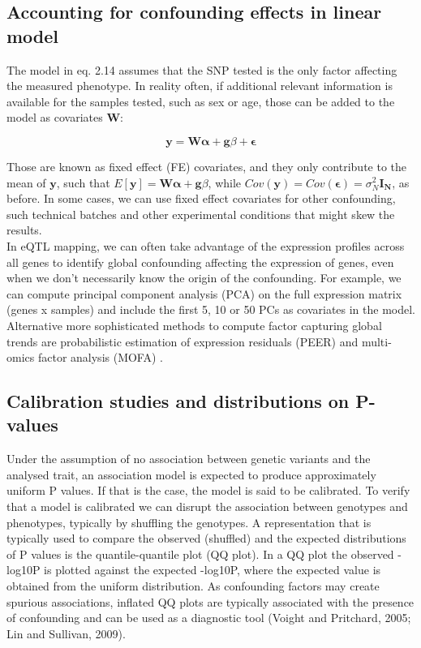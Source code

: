 \subsection{Accounting for confounding effects in linear model}

The model in eq. 2.14 assumes that the SNP tested is the only factor affecting the measured phenotype.
In reality often, if additional relevant information is available for the samples tested, such as sex or age, those can be added to the model as covariates $\mathbf{W}$:

\begin{equation}\label{eq21:Linear_regression_genetics_covariates}
 \mathbf{y} =  \mathbf{W}\boldsymbol{\alpha} + \mathbf{g}\beta + \boldsymbol{\epsilon} 
\end{equation}

Those are known as fixed effect (FE) covariates, and they only contribute to the mean of $\mathbf{y}$, such that $E[\mathbf{y}] = \mathbf{W}\boldsymbol{\alpha} + \mathbf{g}\beta$, while $Cov(\mathbf{y}) = Cov(\boldsymbol{\epsilon}) = \sigma_N^2 \mathbf{I_N} $, as before.
In some cases, we can use fixed effect covariates for other confounding, such technical batches and other experimental conditions that might skew the results. \\

In eQTL mapping, we can often take advantage of the expression profiles across all genes to identify global confounding affecting the expression of genes, even when we don't necessarily know the origin of the confounding.
For example, we can compute principal component analysis (PCA) on the full expression matrix (genes x samples) and include the first 5, 10 or 50 PCs as covariates in the model.
Alternative more sophisticated methods to compute factor capturing global trends are probabilistic estimation of expression residuals (PEER) \cite{stegle2010bayesian, stegle2012using} and multi-omics factor analysis (MOFA) \cite{argelaguet2018multi}. 

\subsection{Calibration studies and distributions on P-values}

Under the assumption of no association between genetic variants and the analysed trait, an association model is expected to produce approximately uniform P values.
If that is the case, the model is said to be calibrated.
To verify that a model is calibrated we can disrupt the association between genotypes and phenotypes, typically by shuffling the genotypes. 
A representation that is typically used to compare the observed (shuffled) and the expected distributions of P values is the quantile-quantile plot (QQ plot). 
In a QQ plot the observed -log10P is plotted against the expected -log10P, where the expected value is obtained from the uniform distribution. 
As confounding factors may create spurious associations, inflated QQ plots are typically associated with the presence of confounding and can be used as a diagnostic tool (Voight and Pritchard, 2005; Lin and Sullivan, 2009). 

